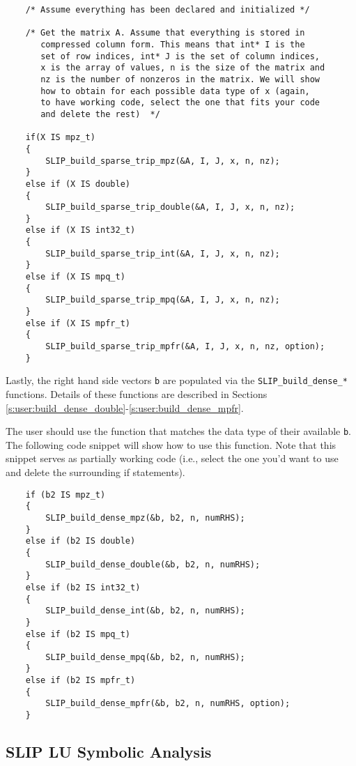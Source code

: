 \documentclass[12pt]{article}
\theoremstyle{definition}
\begin{document}
{\small
    \begin{verbatim}
    /* Assume everything has been declared and initialized */

    /* Get the matrix A. Assume that everything is stored in
       compressed column form. This means that int* I is the
       set of row indices, int* J is the set of column indices,
       x is the array of values, n is the size of the matrix and
       nz is the number of nonzeros in the matrix. We will show
       how to obtain for each possible data type of x (again,
       to have working code, select the one that fits your code
       and delete the rest)  */

    if(X IS mpz_t)
    {
        SLIP_build_sparse_trip_mpz(&A, I, J, x, n, nz);
    }
    else if (X IS double)
    {
        SLIP_build_sparse_trip_double(&A, I, J, x, n, nz);
    }
    else if (X IS int32_t)
    {
        SLIP_build_sparse_trip_int(&A, I, J, x, n, nz);
    }
    else if (X IS mpq_t)
    {
        SLIP_build_sparse_trip_mpq(&A, I, J, x, n, nz);
    }
    else if (X IS mpfr_t)
    {
        SLIP_build_sparse_trip_mpfr(&A, I, J, x, n, nz, option);
    } \end{verbatim} }

Lastly, the right hand side vectors \verb|b| are populated via the
\verb|SLIP_build_dense_*| functions. Details of these functions are described
in Sections \ref{s:user:build_dense_double}-\ref{s:user:build_dense_mpfr}.

The user should use the function that matches the data type of their available
\verb|b|. The following code snippet will show how to use this function. Note
that this snippet serves as partially working code (i.e., select the one you'd
want to use and delete the surrounding if statements).

{\small
    \begin{verbatim}
    if (b2 IS mpz_t)
    {
        SLIP_build_dense_mpz(&b, b2, n, numRHS);
    }
    else if (b2 IS double)
    {
        SLIP_build_dense_double(&b, b2, n, numRHS);
    }
    else if (b2 IS int32_t)
    {
        SLIP_build_dense_int(&b, b2, n, numRHS);
    }
    else if (b2 IS mpq_t)
    {
        SLIP_build_dense_mpq(&b, b2, n, numRHS);
    }
    else if (b2 IS mpfr_t)
    {
        SLIP_build_dense_mpfr(&b, b2, n, numRHS, option);
    } \end{verbatim} }

\cprotect\subsection{SLIP LU Symbolic Analysis}
\label{s:Using:symb}
\end{document}
